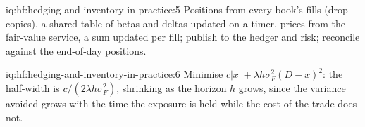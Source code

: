 \begin{solution}{iq:hf:hedging-and-inventory-in-practice:5}
Positions from every book's fills (drop copies), a shared table of betas and deltas updated on a timer, prices from the fair-value service, a sum
updated per fill; publish to the hedger and risk; reconcile against the end-of-day positions.
\end{solution}

\begin{solution}{iq:hf:hedging-and-inventory-in-practice:6}
Minimise $c|x|+\lambda h\sigma_F^2(D-x)^2$: the half-width is $c/(2\lambda h\sigma_F^2)$, shrinking as the horizon $h$ grows, since the variance
avoided grows with the time the exposure is held while the cost of the trade does not.
\end{solution}
